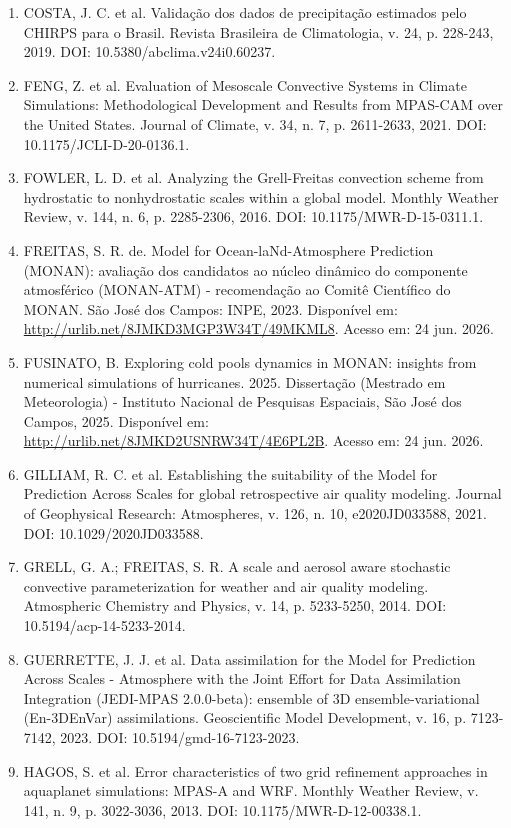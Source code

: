 \documentclass[12pt,a4paper,oneside]{book}
\begin{document}
\begin{enumerate}
\item
  COSTA, J. C. et al. Validação dos dados de precipitação estimados pelo CHIRPS para o Brasil. Revista Brasileira de Climatologia, v. 24, p. 228-243, 2019. DOI: 10.5380/abclima.v24i0.60237.
\item
  FENG, Z. et al. Evaluation of Mesoscale Convective Systems in Climate Simulations: Methodological Development and Results from MPAS-CAM over the United States. Journal of Climate, v. 34, n. 7, p. 2611-2633, 2021. DOI: 10.1175/JCLI-D-20-0136.1.
\item
  FOWLER, L. D. et al. Analyzing the Grell-Freitas convection scheme from hydrostatic to nonhydrostatic scales within a global model. Monthly Weather Review, v. 144, n. 6, p. 2285-2306, 2016. DOI: 10.1175/MWR-D-15-0311.1.
\item
  FREITAS, S. R. de. Model for Ocean-laNd-Atmosphere Prediction (MONAN): avaliação dos candidatos ao núcleo dinâmico do componente atmosférico (MONAN-ATM) - recomendação ao Comitê Científico do MONAN. São José dos Campos: INPE, 2023. Disponível em: \url{http://urlib.net/8JMKD3MGP3W34T/49MKML8}. Acesso em: 24 jun. 2026.
\item
  FUSINATO, B. Exploring cold pools dynamics in MONAN: insights from numerical simulations of hurricanes. 2025. Dissertação (Mestrado em Meteorologia) - Instituto Nacional de Pesquisas Espaciais, São José dos Campos, 2025. Disponível em: \url{http://urlib.net/8JMKD2USNRW34T/4E6PL2B}. Acesso em: 24 jun. 2026.
\item
  GILLIAM, R. C. et al. Establishing the suitability of the Model for Prediction Across Scales for global retrospective air quality modeling. Journal of Geophysical Research: Atmospheres, v. 126, n. 10, e2020JD033588, 2021. DOI: 10.1029/2020JD033588.
\item
  GRELL, G. A.; FREITAS, S. R. A scale and aerosol aware stochastic convective parameterization for weather and air quality modeling. Atmospheric Chemistry and Physics, v. 14, p. 5233-5250, 2014. DOI: 10.5194/acp-14-5233-2014.
\item
  GUERRETTE, J. J. et al. Data assimilation for the Model for Prediction Across Scales - Atmosphere with the Joint Effort for Data Assimilation Integration (JEDI-MPAS 2.0.0-beta): ensemble of 3D ensemble-variational (En-3DEnVar) assimilations. Geoscientific Model Development, v. 16, p. 7123-7142, 2023. DOI: 10.5194/gmd-16-7123-2023.
\item
  HAGOS, S. et al. Error characteristics of two grid refinement approaches in aquaplanet simulations: MPAS-A and WRF. Monthly Weather Review, v. 141, n. 9, p. 3022-3036, 2013. DOI: 10.1175/MWR-D-12-00338.1.

\end{enumerate}
\end{document}
